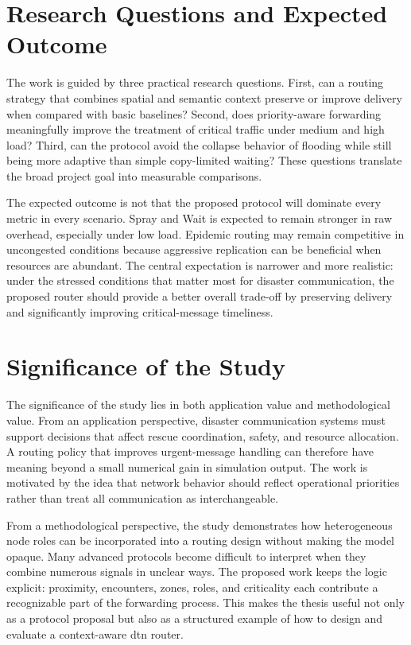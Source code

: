 \section{Research Questions and Expected Outcome}
The work is guided by three practical research questions. First, can a routing strategy that combines spatial and semantic context preserve or improve delivery when compared with basic baselines? Second, does priority-aware forwarding meaningfully improve the treatment of critical traffic under medium and high load? Third, can the protocol avoid the collapse behavior of flooding while still being more adaptive than simple copy-limited waiting? These questions translate the broad project goal into measurable comparisons.

The expected outcome is not that the proposed protocol will dominate every metric in every scenario. Spray and Wait is expected to remain stronger in raw overhead, especially under low load. Epidemic routing may remain competitive in uncongested conditions because aggressive replication can be beneficial when resources are abundant. The central expectation is narrower and more realistic: under the stressed conditions that matter most for disaster communication, the proposed router should provide a better overall trade-off by preserving delivery and significantly improving critical-message timeliness.

\section{Significance of the Study}
The significance of the study lies in both application value and methodological value. From an application perspective, disaster communication systems must support decisions that affect rescue coordination, safety, and resource allocation. A routing policy that improves urgent-message handling can therefore have meaning beyond a small numerical gain in simulation output. The work is motivated by the idea that network behavior should reflect operational priorities rather than treat all communication as interchangeable.

From a methodological perspective, the study demonstrates how heterogeneous node roles can be incorporated into a routing design without making the model opaque. Many advanced protocols become difficult to interpret when they combine numerous signals in unclear ways. The proposed work keeps the logic explicit: proximity, encounters, zones, roles, and criticality each contribute a recognizable part of the forwarding process. This makes the thesis useful not only as a protocol proposal but also as a structured example of how to design and evaluate a context-aware \ac{dtn} router.

